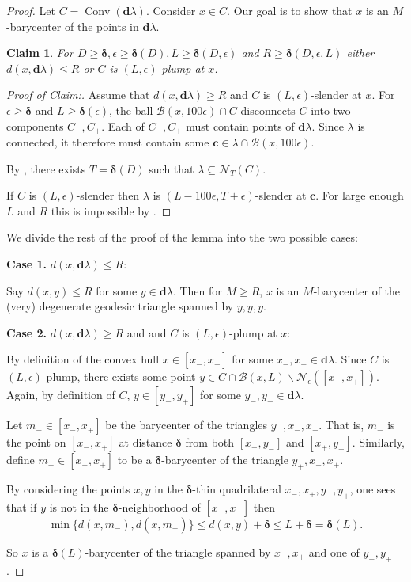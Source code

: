 \documentclass{amsart}
\numberwithin{equation}{section}
\newtheorem*{claim*}{Claim}
\theoremstyle{definition}
\newcommand{\bfc}{\mathbf{c}}
\newcommand{\bfd}{\mathbf{d}}
\newcommand{\calB}{\mathcal{B}}
\newcommand{\calN}{\mathcal{N}}
\newcommand{\bdelta}{{\boldsymbol\delta}}
\newcommand{\ssm}{\smallsetminus}
\newcommand{\nir}[1]{\todo[inline, color=magenta]{#1}}
\DeclareMathOperator{\conv}{Conv}
\begin{document}
\begin{proof}
    Let $C = \conv(\bfd \lambda)$. 
    Consider $x\in C$. 
    Our goal is to show that $x$ is an $M$-barycenter of the points in $\bfd\lambda$. 
    
    \begin{claim*}
    For $D\ge \bdelta, \epsilon\ge \bdelta (D), L \ge \bdelta(D,\epsilon)$ and $R\ge \bdelta(D,\epsilon,L)$ either $d(x,\bfd\lambda)\le R$ or $C$ is $(L,\epsilon)$-plump at $x$. 
    \end{claim*}
    \begin{proof}[Proof of Claim:]

    Assume that $d(x,\bfd\lambda)\ge R$ and $C$ is $(L,\epsilon)$-slender at $x$. 
    For $\epsilon \ge \bdelta$ and $L\ge \bdelta( \epsilon)$, the ball $\calB(x,100\epsilon)\cap C$ disconnects $C$ into two components $C_-,C_+$. 
    Each of $C_-,C_+$ must contain points of $\bfd\lambda$. 
    Since $\lambda$ is connected, it therefore must contain some $\bfc\in \lambda \cap \calB(x,100\epsilon)$.

    By , there exists $T=\bdelta(D)$ such that $\lambda \subseteq \calN_T(C)$.

    If $C$ is $(L,\epsilon)$-slender then $\lambda$ is $(L-100\epsilon,T+\epsilon)$-slender at $\bfc$.
    For large enough $L$ and $R$ this is impossible by .
    \end{proof}
    

    
    
    We divide the rest of the proof of the lemma into the two possible cases:

    \noindent\textbf{Case 1.}   $d(x,\bfd\lambda)\le R$:

    Say $d(x,y)\le R$ for some $y\in \bfd \lambda$. Then for $M\ge R$,  $x$ is an $M$-barycenter of the (very) degenerate geodesic triangle spanned by $y,y,y$.

    \noindent\textbf{Case 2.}  $d(x,\bfd\lambda)\ge R$ and 
     and $C$ is $(L,\epsilon)$-plump at $x$:

    By definition of the convex hull $x\in [x_-,x_+]$ for some $x_-,x_+\in \bfd\lambda$.
    Since $C$ is $(L,\epsilon)$-plump, there exists some point $y\in C\cap \calB(x,L) \ssm \calN_\epsilon([x_-,x_+])$.
    Again, by definition of $C$, $y\in [y_-,y_+]$ for some $y_-,y_+\in \bfd\lambda$.

    Let $m_-\in [x_-,x_+]$ be the barycenter of the triangles $y_-,x_-,x_+$. That is, $m_-$ is the point on $[x_-,x_+]$ at distance $\bdelta$ from both $[x_-,y_-]$ and $[x_+,y_-]$.
    Similarly, define $m_+\in [x_-,x_+]$ to be a $\bdelta$-barycenter of the triangle $y_+,x_-,x_+$.
    
    By considering the points $x,y$ in the $\bdelta$-thin quadrilateral $x_-,x_+,y_-,y_+$, one sees that if $y$ is not in the $\bdelta$-neighborhood of $[x_-,x_+]$ then 
    $$\min\{d(x,m_-),d(x,m_+)\}\le d(x,y)+\bdelta\le L+\bdelta = \bdelta(L).$$ 

    So $x$ is a $\bdelta(L)$-barycenter of the triangle spanned by $x_-,x_+$ and one of $y_-,y_+$.  
\end{proof}
\end{document}

